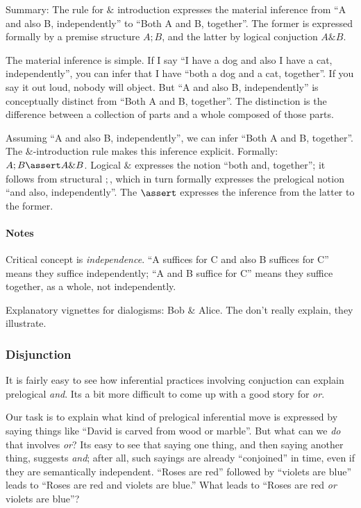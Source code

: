 \documentclass{article}
\begin{document}
Summary: The rule for \(\&\) introduction expresses the material
inference from ``A and also B, independently'' to ``Both A and B,
together''. The former is expressed formally by a premise structure
\(A ; B\), and the latter by logical conjuction \(A \& B\).

The material inference is simple. If I say ``I have a dog and also I
have a cat, independently'', you can infer that I have ``both a dog and a
cat, together''. If you say it out loud, nobody will object. But ``A
and also B, independently'' is conceptually distinct from ``Both A and B,
together''. The distinction is the difference between a collection of
parts and a whole composed of those parts.

Assuming ``A and also B, independently'', we can infer ``Both A and B,
together''. The \(\&\)-introduction rule makes this inference
explicit. Formally: \(A ; B \linfer A \& B\). Logical \(\&\)
expresses the notion ``both and, together''; it follows from
structural \(;\), which in turn formally expresses the prelogical
notion ``and also, independently''. The \(\linfer\) expresses the inference
from the latter to the former.

\paragraph{Notes\\}

Critical concept is \textit{independence}. ``A suffices for C and also
B suffices for C'' means they suffice independently; ``A and B suffice
for C'' means they suffice together, as a whole, not independently.

Explanatory vignettes for dialogisms: Bob \& Alice. The don't really
explain, they illustrate.

\subsubsection{Disjunction}

It is fairly easy to see how inferential practices involving
conjuction can explain prelogical \textit{and}. Its a bit more
difficult to come up with a good story for \textit{or}.

Our task is to explain what kind of prelogical inferential move is
expressed by saying things like ``David is carved from wood or
marble''. But what can we \textit{do} that involves \textit{or}? Its
easy to see that saying one thing, and then saying another thing,
suggests \textit{and}; after all, such sayings are already
``conjoined'' in time, even if they are semantically independent.
``Roses are red'' followed by ``violets are blue'' leads to ``Roses
are red and violets are blue.'' What leads to ``Roses are red
\textit{or} violets are blue''?
\end{document}
